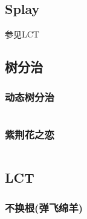 \documentclass[a4paper]{article}
\begin{document}
\begin{multicols}{2}








			\subsection{Splay}
				参见LCT
			
			\subsection{树分治}

				
				\subsubsection{动态树分治}
					\inputminted{cpp}{../src/数据结构/动态树分治.cpp}

				\subsubsection{紫荆花之恋}
					\inputminted{cpp}{../src/数据结构/紫荆花之恋.cpp}

				\subsection{LCT}
					\subsubsection{不换根(弹飞绵羊)}
						\inputminted{cpp}{../src/数据结构/LCT(不换根).cpp}
				

\end{multicols}
\end{document}
